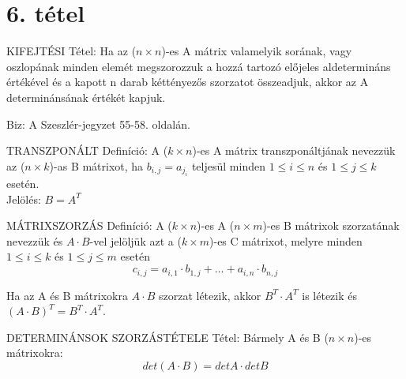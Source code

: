 \section{6. tétel}

\begin{tetel}{
KIFEJTÉSI Tétel}: Ha az ($n \times n$)-es A mátrix valamelyik sorának, vagy oszlopának minden elemét megszorozzuk a hozzá tartozó előjeles aldetermináns értékével és a kapott n darab kéttényezős szorzatot összeadjuk, akkor az A determinánsának értékét kapjuk.
\end{tetel}
\begin{leftbar}
Biz: A Szeszlér-jegyzet 55-58. oldalán.
\end{leftbar}
\begin{definicio}{
TRANSZPONÁLT Definíció}: A ($k\times n$)-es A mátrix transzponáltjának nevezzük az ($n\times k$)-as B mátrixot, ha $b_{i,j} = a_{j_i}$ teljesül minden $1 \leq i \leq n$ és $1 \leq j \leq k$ esetén.\\
Jelölés: $B = A^T$
\end{definicio}
\begin{definicio}{
MÁTRIXSZORZÁS Definíció}: A ($k\times n$)-es A ($n\times m$)-es B mátrixok szorzatának nevezzük és $A\cdot B$-vel jelöljük azt a ($k\times m$)-es C mátrixot, melyre minden $1 \leq i \leq k$ és $1 \leq j \leq m$ esetén
$$c_{i,j} = a_{i,1}\cdot b_{1, j}+\ldots+a_{i,n}\cdot b_{n,j}$$
\end{definicio}
Ha az A és B mátrixokra $A \cdot B$ szorzat létezik, akkor $B^T \cdot A^T$ is létezik és $(A\cdot B)^T = B^T \cdot A^T$.
\begin{tetel}{
DETERMINÁNSOK SZORZÁSTÉTELE Tétel}: Bármely A és B ($n\times n$)-es mátrixokra: $$det(A\cdot B)=detA \cdot detB$$
\end{tetel}
